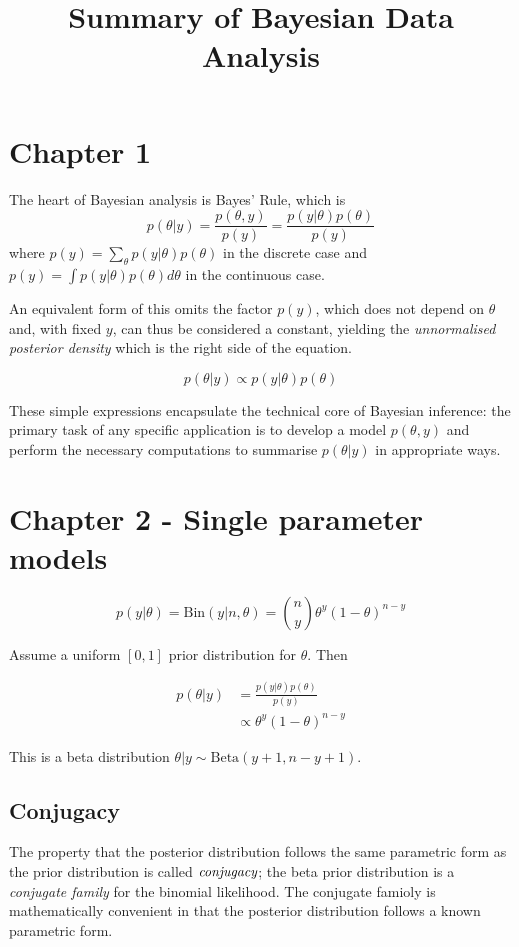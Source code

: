 \documentclass[11pt]{amsart}
\title{Summary of Bayesian Data Analysis}
\begin{document}
\maketitle
\section{Chapter 1}
The heart of Bayesian analysis is Bayes' Rule, which is
\[
	p(\theta|y) = \frac{p(\theta, y)}{p(y)} = \frac{p(y|\theta)p(\theta)}{p(y)}
\]
where $p(y) = \sum_\theta p(y|\theta) p(\theta)$ in the discrete case and
$p(y) = \int p(y|\theta)p(\theta) d\theta$ in the continuous case.

An equivalent form of this omits the factor $p(y)$, which does not depend on 
$\theta$ and, with fixed $y$, can thus be considered a constant, yielding the
\emph{unnormalised posterior density} which is the right side of the equation.

\[
p(\theta|y) \propto p(y|\theta)p(\theta)
\]

These simple expressions encapsulate the technical core of Bayesian inference:
the primary task of any specific application is to develop a model $p(\theta, y)$
and perform the necessary computations to summarise $p(\theta|y)$ in appropriate
ways.

\section{Chapter 2 - Single parameter models}


\[
	p(y|\theta) = \text{Bin}(y|n, \theta) = {n \choose y}\theta^y (1-\theta)^{n-y}
\]

Assume a uniform $[0, 1]$ prior distribution for $\theta$. Then

\begin{align*}
p(\theta|y) &=\frac{p(y|\theta)p(\theta)}{p(y)} \\
	& \propto \theta^y (1-\theta)^{n-y}
\end{align*}

This is a beta distribution $\theta|y \sim \text{Beta}(y+1, n-y+1)$.

\subsection{Conjugacy}
The property that the posterior distribution follows the same parametric form
as the prior distribution is called $\emph{conjugacy}$; the beta prior 
distribution is a \emph{conjugate family} for the binomial likelihood. The
conjugate famioly is mathematically convenient in that the posterior distribution
follows a known parametric form.
\end{document}
